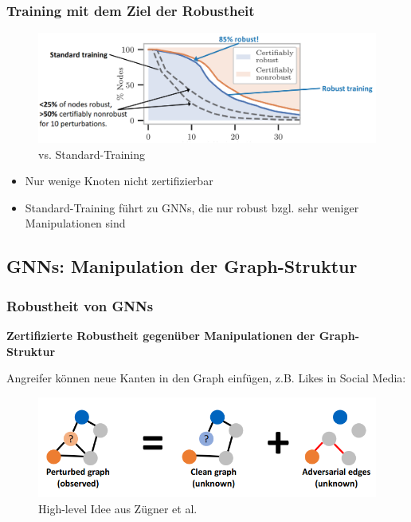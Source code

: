 \documentclass{beamer}
\begin{document}
\begin{frame}
  \frametitle{Training mit dem Ziel der Robustheit}
  \begin{figure}
    \centering
    \includegraphics[width=\textwidth]{img/robust_training.png}
    \caption*{ vs. Standard-Training \cite{Zuegner_2019}}
  \end{figure}
  \begin{itemize}
    \item Nur wenige Knoten nicht zertifizierbar
    \item Standard-Training führt zu GNNs, die nur robust bzgl. sehr weniger Manipulationen sind
  \end{itemize}
\end{frame}

\subsection{GNNs: Manipulation der Graph-Struktur}

\begin{frame}
  \frametitle{Robustheit von GNNs}
  \textbf{Zertifizierte Robustheit gegenüber Manipulationen der Graph-Struktur}\newline

  Angreifer können neue Kanten in den Graph einfügen, z.B. Likes in Social Media:
  \begin{figure}
    \centering
    \includegraphics[width=\textwidth]{img/high_level_graph_pert.png}
    \caption*{High-level Idee aus Zügner et al. \cite{10.1145/3394486.3403217}}
  \end{figure}
\end{frame}
\end{document}
